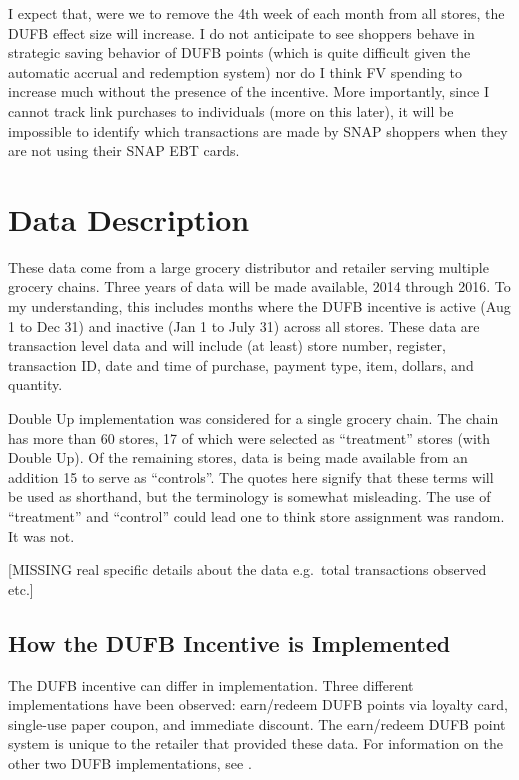 \documentclass[12pt,letterpaperpaper,]{book}
\begin{document}
I expect that, were we to remove the 4th week of each month from all
stores, the DUFB effect size will increase. I do not anticipate to see
shoppers behave in strategic saving behavior of DUFB points (which is
quite difficult given the automatic accrual and redemption system) nor
do I think FV spending to increase much without the presence of the
incentive. More importantly, since I cannot track link purchases to
individuals (more on this later), it will be impossible to identify
which transactions are made by SNAP shoppers when they are not using
their SNAP EBT cards.

\newpage

\hypertarget{data-1}{\section*{Data Description}\label{data-1}}

These data come from a large grocery distributor and retailer serving
multiple grocery chains. Three years of data will be made available,
2014 through 2016. To my understanding, this includes months where the
DUFB incentive is active (Aug 1 to Dec 31) and inactive (Jan 1 to July
31) across all stores. These data are transaction level data and will
include (at least) store number, register, transaction ID, date and time
of purchase, payment type, item, dollars, and quantity.

Double Up implementation was considered for a single grocery chain. The
chain has more than 60 stores, 17 of which were selected as
``treatment'' stores (with Double Up). Of the remaining stores, data is
being made available from an addition 15 to serve as ``controls''. The
quotes here signify that these terms will be used as shorthand, but the
terminology is somewhat misleading. The use of ``treatment'' and
``control'' could lead one to think store assignment was random. It was
not.

{[}MISSING real specific details about the data e.g.~total transactions
observed etc.{]}

\subsection*{How the DUFB Incentive is
Implemented}\label{how-the-dufb-incentive-is-implemented}

The DUFB incentive can differ in implementation. Three different
implementations have been observed: earn/redeem DUFB points via loyalty
card, single-use paper coupon, and immediate discount. The earn/redeem
DUFB point system is unique to the retailer that provided these data.
For information on the other two DUFB implementations, see
\citep{margaret_schnuck_doubling_2016}.
\end{document}
